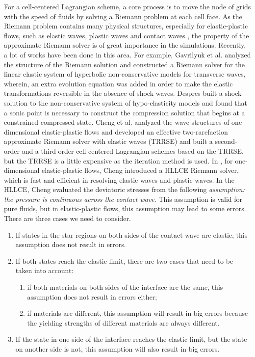 \documentclass[review]{elsarticle}
\begin{document}
For a cell-centered Lagrangian scheme, a core process is to move the node of grids with the speed of fluids
 by solving a Riemann problem at each cell face. As the Riemann problem contains many physical structures, especially for elastic-plastic flows, such as elastic waves, plastic waves and contact waves
  , the property of the approximate Riemann solver is of great importance in the simulations. Recently, a lot of works have been done in
  this area. For example, Gavrilyuk et al. \cite{gavrilyuk2008modelling} analyzed the structure of the Riemann solution and constructed a Riemann solver for the linear elastic system  of hyperbolic non-conservative models for transverse waves, wherein, an extra evolution equation was added in order to make the elastic transformations reversible in the absence of shock waves. Despres \cite{despres2007geometrical} built a shock solution to the  non-conservative  system of hypo-elasticity models and found that a sonic point is necessary to construct  the compression solution that begins at a constrained compressed state.  Cheng et al.  \cite{cheng2015high} analyzed the wave structures of one-dimensional elastic-plastic flows and developed an effective two-rarefaction approximate Riemann solver with elastic waves (TRRSE) and built a  second-order and  a third-order cell-centered Lagrangian schemes based on the TRRSE, but the TRRSE is a little  expensive as  the iteration method is used.
In \cite{cheng2016harten}, for one-dimensional elastic-plastic flows, Cheng introduced a HLLCE Riemann solver, which is fast and efficient in resolving elastic waves and plastic waves. In the HLLCE,  Cheng evaluated the deviatoric stresses from the following \emph{assumption: the  pressure is continuous across the contact wave}. This assumption is valid for pure fluids, but  in  elastic-plastic flows, this assumption may lead to some errors. There are three cases we need  to consider.
\begin{enumerate}
  \item If states in the star regions on both sides of the contact wave are elastic, this assumption does not result in errors.
  \item If both states reach the elastic limit, there are two cases that  need to be taken into account:
  \begin{enumerate}
    \item if both  materials on both sides of the interface are the  same, this assumption does not result in errors either;
    \item if  materials are different, this assumption will result in big errors because the yielding strengths of different materials are always different.
  \end{enumerate}
  \item If the  state in one side of the interface reaches the elastic limit, but the state  on another side  is  not,  this assumption will  also result in big errors.
\end{enumerate}
\end{document}
